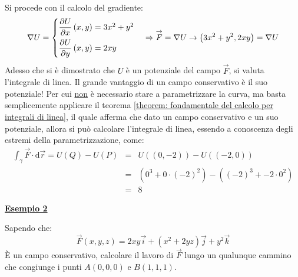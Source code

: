 \documentclass[a4paper]{article}
\newcommand{\example}[1]{\textcolor{Green4}{\textbf{#1}}}
\begin{document}
	\noindent
	Si procede con il calcolo del gradiente:
	\begin{equation*}
		\nabla U = \begin{cases}
			\dfrac{\partial U}{\partial x}\left(x,y\right) = 3x^{2} + y^{2} \vspace{.5em}\\
			\dfrac{\partial U}{\partial y}\left(x,y\right) = 2xy
		\end{cases}
		\Rightarrow
		\overset{\rightarrow}{F} = \nabla U \rightarrow \left(3x^{2}+y^{2}, 2xy\right) = \nabla U
	\end{equation*}
	Adesso che si è dimostrato che $U$ è un potenziale del campo $\overset{\rightarrow}{F}$, si valuta l'integrale di linea. Il grande vantaggio di un campo conservativo è il suo potenziale! Per cui \underline{non} è necessario stare a parametrizzare la curva, ma basta semplicemente applicare il teorema \ref{theorem: fondamentale del calcolo per integrali di linea}, il quale afferma che dato un campo conservativo e un suo potenziale, allora si può calcolare l'integrale di linea, essendo a conoscenza degli estremi della parametrizzazione, come:
	\begin{equation*}
		\begin{array}{rcl}
			\displaystyle\int_{\gamma} \overset{\rightarrow}{F} \cdot \mathrm{d}\overset{\rightarrow}{r} = U\left(Q\right) - U\left(P\right) 
			&=& 
			U\left(\left(0,-2\right)\right) - U\left(\left(-2,0\right)\right) \\ [1em]
			&=& 
			\left(0^{3} + 0 \cdot \left(-2\right)^{2}\right) - \left(\left(-2\right)^{3} + -2 \cdot 0^{2}\right) \\ [1em]
			&=&
			8
		\end{array}
	\end{equation*}

	\begin{flushleft}
		\example{\underline{Esempio 2}}
	\end{flushleft}
	Sapendo che:
	\begin{equation*}
		\overset{\rightarrow}{F}\left(x,y,z\right) = 2xy\overset{\rightarrow}{i} + \left(x^{2} + 2yz\right)\overset{\rightarrow}{j} + y^{2}\overset{\rightarrow}{k}
	\end{equation*}
	È un campo conservativo, calcolare il lavoro di $\overset{\rightarrow}{F}$ lungo un qualunque cammino che congiunge i punti $A\left(0,0,0\right)$ e $B\left(1,1,1\right)$.\newline
\end{document}

